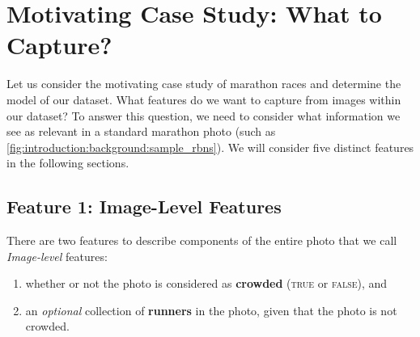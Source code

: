 \section{Motivating Case Study: What to Capture?}
\label{sec:dataset:architecture:what_to_capture}

Let us consider the motivating case study of marathon races and determine the model of our dataset. What features do we want to capture from images within our dataset? To answer this question, we need to consider what information we see as relevant in a standard marathon photo (such as \cref{fig:introduction:background:sample_rbns}). We will consider five distinct features in the following sections.

\clearpage
\subsection{Feature 1: Image-Level Features}

There are two features to describe components of the entire photo that we call \textit{Image-level} features:

\begin{enumerate}
  \item whether or not the photo is considered as \textbf{crowded} (\textsc{true} or \textsc{false}), and
  \item an \textit{optional} collection of \textbf{runners} in the photo, given that the photo is not crowded.
\end{enumerate}

